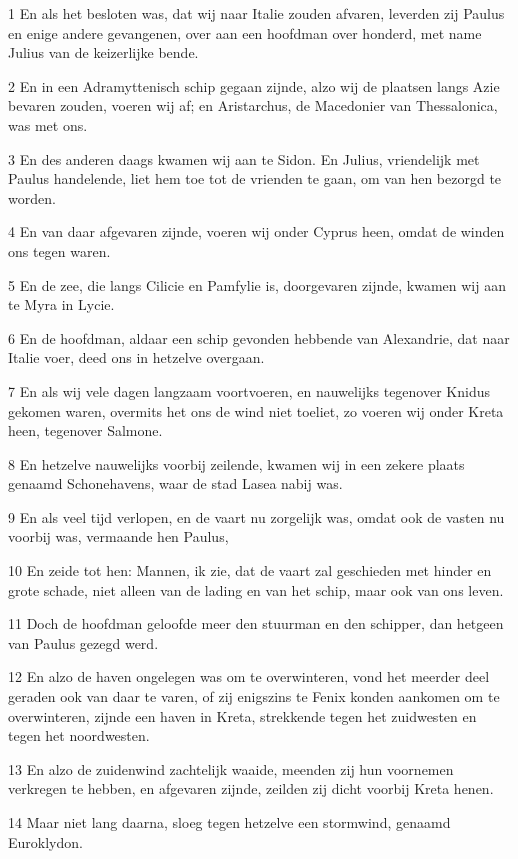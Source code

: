 \par 1 En als het besloten was, dat wij naar Italie zouden afvaren, leverden zij Paulus en enige andere gevangenen, over aan een hoofdman over honderd, met name Julius van de keizerlijke bende.
\par 2 En in een Adramyttenisch schip gegaan zijnde, alzo wij de plaatsen langs Azie bevaren zouden, voeren wij af; en Aristarchus, de Macedonier van Thessalonica, was met ons.
\par 3 En des anderen daags kwamen wij aan te Sidon. En Julius, vriendelijk met Paulus handelende, liet hem toe tot de vrienden te gaan, om van hen bezorgd te worden.
\par 4 En van daar afgevaren zijnde, voeren wij onder Cyprus heen, omdat de winden ons tegen waren.
\par 5 En de zee, die langs Cilicie en Pamfylie is, doorgevaren zijnde, kwamen wij aan te Myra in Lycie.
\par 6 En de hoofdman, aldaar een schip gevonden hebbende van Alexandrie, dat naar Italie voer, deed ons in hetzelve overgaan.
\par 7 En als wij vele dagen langzaam voortvoeren, en nauwelijks tegenover Knidus gekomen waren, overmits het ons de wind niet toeliet, zo voeren wij onder Kreta heen, tegenover Salmone.
\par 8 En hetzelve nauwelijks voorbij zeilende, kwamen wij in een zekere plaats genaamd Schonehavens, waar de stad Lasea nabij was.
\par 9 En als veel tijd verlopen, en de vaart nu zorgelijk was, omdat ook de vasten nu voorbij was, vermaande hen Paulus,
\par 10 En zeide tot hen: Mannen, ik zie, dat de vaart zal geschieden met hinder en grote schade, niet alleen van de lading en van het schip, maar ook van ons leven.
\par 11 Doch de hoofdman geloofde meer den stuurman en den schipper, dan hetgeen van Paulus gezegd werd.
\par 12 En alzo de haven ongelegen was om te overwinteren, vond het meerder deel geraden ook van daar te varen, of zij enigszins te Fenix konden aankomen om te overwinteren, zijnde een haven in Kreta, strekkende tegen het zuidwesten en tegen het noordwesten.
\par 13 En alzo de zuidenwind zachtelijk waaide, meenden zij hun voornemen verkregen te hebben, en afgevaren zijnde, zeilden zij dicht voorbij Kreta henen.
\par 14 Maar niet lang daarna, sloeg tegen hetzelve een stormwind, genaamd Euroklydon.

